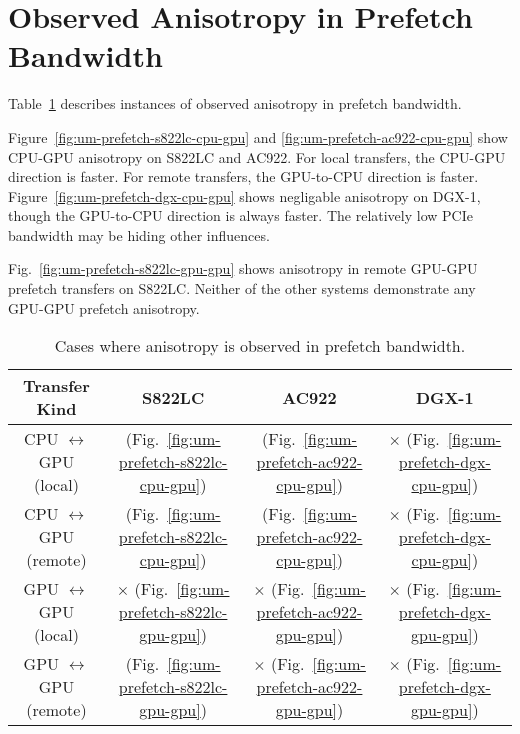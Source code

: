 \section{Observed Anisotropy in Prefetch Bandwidth}

Table~\ref{tab:um-prefetch-anisotropy} describes instances of observed anisotropy in prefetch bandwidth.

Figure~\ref{fig:um-prefetch-s822lc-cpu-gpu} and \ref{fig:um-prefetch-ac922-cpu-gpu} show CPU-GPU anisotropy on S822LC and AC922.
For local transfers, the CPU-GPU direction is faster.
For remote transfers, the GPU-to-CPU direction is faster.
Figure~\ref{fig:um-prefetch-dgx-cpu-gpu} shows negligable anisotropy on DGX-1, though the GPU-to-CPU direction is always faster.
The relatively low PCIe bandwidth may be hiding other influences.

Fig.~\ref{fig:um-prefetch-s822lc-gpu-gpu} shows anisotropy in remote GPU-GPU prefetch transfers on S822LC.
Neither of the other systems demonstrate any GPU-GPU prefetch anisotropy.

\begin{table}[ht]
	\centering
	\caption[Anisotropy in Prefetch Bandwidth]{
		Cases where anisotropy is observed in prefetch bandwidth.
	}
	\label{tab:um-prefetch-anisotropy}
	\begin{tabular}{|c|c|c|c|}
		\hline
		\textbf{Transfer Kind}             & \textbf{S822LC}                                         & \textbf{AC922}                                         & \textbf{DGX-1}                            \\ \hline 
		CPU $\leftrightarrow$ GPU (local)  & \checkmark (Fig.~\ref{fig:um-prefetch-s822lc-cpu-gpu}) & \checkmark (Fig.~\ref{fig:um-prefetch-ac922-cpu-gpu}) & $\times$ (Fig.~\ref{fig:um-prefetch-dgx-cpu-gpu}) \\ \hline
		CPU $\leftrightarrow$ GPU (remote) & \checkmark (Fig.~\ref{fig:um-prefetch-s822lc-cpu-gpu}) & \checkmark (Fig.~\ref{fig:um-prefetch-ac922-cpu-gpu}) & $\times$ (Fig.~\ref{fig:um-prefetch-dgx-cpu-gpu}) \\ \hline
		GPU $\leftrightarrow$ GPU (local)  & $\times$   (Fig.~\ref{fig:um-prefetch-s822lc-gpu-gpu}) & $\times$   (Fig.~\ref{fig:um-prefetch-ac922-gpu-gpu}) & $\times$ (Fig.~\ref{fig:um-prefetch-dgx-gpu-gpu}) \\ \hline
		GPU $\leftrightarrow$ GPU (remote) & \checkmark (Fig.~\ref{fig:um-prefetch-s822lc-gpu-gpu}) & $\times$   (Fig.~\ref{fig:um-prefetch-ac922-gpu-gpu}) & $\times$ (Fig.~\ref{fig:um-prefetch-dgx-gpu-gpu}) \\ \hline
	\end{tabular}
\end{table}

